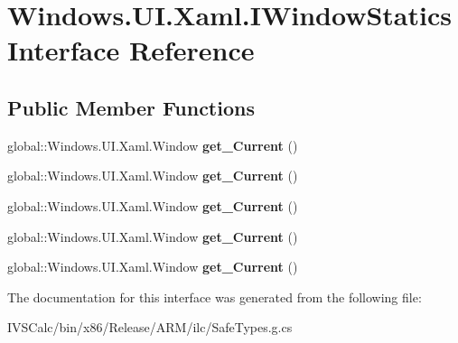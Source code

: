 \hypertarget{interface_windows_1_1_u_i_1_1_xaml_1_1_i_window_statics}{}\section{Windows.\+U\+I.\+Xaml.\+I\+Window\+Statics Interface Reference}
\label{interface_windows_1_1_u_i_1_1_xaml_1_1_i_window_statics}
\subsection*{Public Member Functions}
\begin{DoxyCompactItemize}
\item 
\mbox{\label{interface_windows_1_1_u_i_1_1_xaml_1_1_i_window_statics_aa9a87fbeff3da06cdb30147a7c286c0a}} 
global\+::\+Windows.\+U\+I.\+Xaml.\+Window {\bfseries get\+\_\+\+Current} ()
\item 
\mbox{\label{interface_windows_1_1_u_i_1_1_xaml_1_1_i_window_statics_aa9a87fbeff3da06cdb30147a7c286c0a}} 
global\+::\+Windows.\+U\+I.\+Xaml.\+Window {\bfseries get\+\_\+\+Current} ()
\item 
\mbox{\label{interface_windows_1_1_u_i_1_1_xaml_1_1_i_window_statics_aa9a87fbeff3da06cdb30147a7c286c0a}} 
global\+::\+Windows.\+U\+I.\+Xaml.\+Window {\bfseries get\+\_\+\+Current} ()
\item 
\mbox{\label{interface_windows_1_1_u_i_1_1_xaml_1_1_i_window_statics_aa9a87fbeff3da06cdb30147a7c286c0a}} 
global\+::\+Windows.\+U\+I.\+Xaml.\+Window {\bfseries get\+\_\+\+Current} ()
\item 
\mbox{\label{interface_windows_1_1_u_i_1_1_xaml_1_1_i_window_statics_aa9a87fbeff3da06cdb30147a7c286c0a}} 
global\+::\+Windows.\+U\+I.\+Xaml.\+Window {\bfseries get\+\_\+\+Current} ()
\end{DoxyCompactItemize}


The documentation for this interface was generated from the following file\+:\begin{DoxyCompactItemize}
\item 
I\+V\+S\+Calc/bin/x86/\+Release/\+A\+R\+M/ilc/Safe\+Types.\+g.\+cs\end{DoxyCompactItemize}
